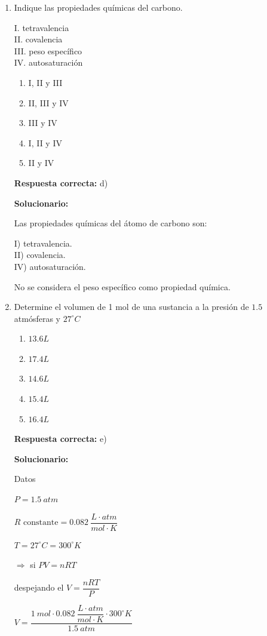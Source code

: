 \begin{enumerate}[resume]
	
	\item Indique las propiedades químicas del carbono.
	
	I. tetravalencia\\
	II. covalencia\\
	III. peso específico\\
	IV. autosaturación
	
	\begin{enumerate}[label=\alph*)]
		\item I, II y III
		\item II, III y IV
		\item III y IV
		\item I, II y IV
		\item II y IV
	\end{enumerate}
	\textbf{Respuesta correcta:} d)
	
	\vspace{2mm}
	\textbf{Solucionario:}
	
	Las propiedades químicas del átomo de carbono son:
	
	I) tetravalencia.\\
	II) covalencia.\\
	IV) autosaturación.
	
	No se considera el peso específico como propiedad química.
	
	\vspace{6mm}
	
	\item Determine el volumen de 1 mol de una sustancia a la presión de $1.5$ atmósferas y $27^\circ C$
	
	\begin{enumerate}[label=\alph*)]
		\item $13.6L$
		\item $17.4L$
		\item $14.6L$
		\item $15.4L$
		\item $16.4L$
	\end{enumerate}
	\textbf{Respuesta correcta:} e)
	
	\vspace{2mm}
	\textbf{Solucionario:}
	
	
	Datos
	
	$P=1.5\ atm$
	
	$R\text{ constante}=0.082\ \dfrac{L\cdot atm}{mol\cdot K}$
	
	$T=27^\circ C=300^\circ K$
	
	$\Rightarrow$ si \hspace{2mm} $PV=nRT$
	
	despejando el $V=\dfrac{nRT}{P}$
	
	$V=\dfrac{1\ mol\cdot 0.082\ \dfrac{L\cdot atm}{mol\cdot K}\cdot 300^\circ K}{1.5\ atm}$
	
	
	\vspace{6mm}
	
\end{enumerate}





